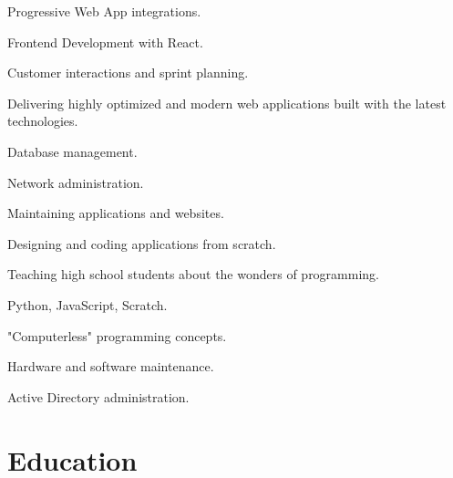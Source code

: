 \documentclass[]{deedy-resume-openfont}
\begin{document}
\begin{tightemize}
\item Progressive Web App integrations.
\item Frontend Development with React.
\item Customer interactions and sprint planning.
\item Delivering highly optimized and modern web applications built with the latest technologies.
\end{tightemize}
\sectionsep

\begin{tightemize}
\item Database management.
\item Network administration.
\item Maintaining applications and websites.
\item Designing and coding applications from scratch.
\end{tightemize}
\sectionsep

\begin{tightemize}
\item Teaching high school students about the wonders of programming.
\item Python, JavaScript, Scratch.
\item "Computerless" programming concepts.
\end{tightemize}
\sectionsep

\begin{tightemize}
\item Hardware and software maintenance.
\item Active Directory administration.
\end{tightemize}
\sectionsep

\section{Education}
\sectionsep
\end{document}
